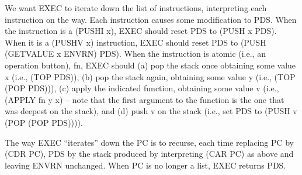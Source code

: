 \documentclass[11pt]{book}
\begin{document}
We want EXEC to iterate down the list of instructions,
interpreting each instruction on the way.  Each instruction causes
some modification to PDS.
When the instruction is a (PUSHI x), EXEC should reset PDS to (PUSH x PDS).
When it is a (PUSHV x) instruction,
EXEC should reset PDS to (PUSH (GETVALUE x ENVRN) PDS).
When the instruction is atomic (i.e., an operation button), fn, EXEC
should (a) pop the stack once obtaining some value x (i.e., (TOP PDS)), (b) pop the stack again, obtaining some value y (i.e.,
(TOP (POP PDS))), (c) apply the indicated function, obtaining some value v
(i.e., (APPLY fn y x) -- note that the first argument to the function is
the one that was deepest on the stack),
and (d) push v on the stack (i.e., set PDS to (PUSH v (POP (POP PDS)))).

The way EXEC ``iterates'' down the PC is to recurse,
each time replacing PC by (CDR PC),  PDS by the stack
produced by
interpreting (CAR PC) as above and
leaving ENVRN unchanged.  When PC is no longer a list, EXEC
returns PDS.
\end{document}
